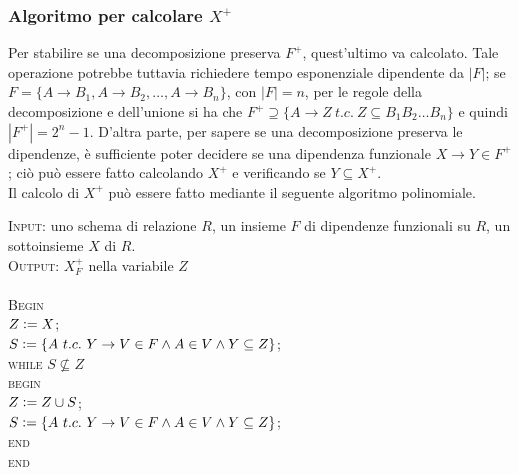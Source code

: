 \subsubsection{Algoritmo per calcolare $X^+$}
Per stabilire se una decomposizione preserva $F^+$, quest'ultimo va calcolato. Tale operazione potrebbe 
tuttavia richiedere tempo esponenziale dipendente da $|F|$; se $F = \{A \rightarrow B_1, A \rightarrow B_2,
\ldots, A \rightarrow B_n\}$, con $|F|=n$, per le regole della decomposizione e dell'unione si ha che 
$F^+ \supseteq \{A \rightarrow Z\ t.c.\ Z \subseteq B_1B_2\ldots B_n\}$ e quindi $|F^+| = 2^n-1$. D'altra parte,
per sapere se una decomposizione preserva le dipendenze, è sufficiente poter decidere se una dipendenza 
funzionale $X \rightarrow Y \in F^+$; ciò può essere fatto calcolando $X^+$ e verificando se $Y \subseteq 
X^+$.\\ 
Il calcolo di $X^+$ può essere fatto mediante il seguente algoritmo polinomiale.
\begin{alg}
\textsc{Input:} uno schema di relazione $R$, un insieme $F$ di dipendenze funzionali su $R$, un sottoinsieme
$X$ di $R$.\\
\textsc{Output:} $X^+_F$ nella variabile $Z$\\\\
\textsc{Begin}\\
$Z\vcentcolon= X$;\\
$S\vcentcolon= \{A\ t.c.\ Y \rightarrow V \in F \wedge A \in V \wedge Y \subseteq Z\}$;\\
\textsc{while} $S \not \subseteq Z$\\
\indent \textsc{begin}\\
\indent $Z\vcentcolon = Z \cup S$;\\
\indent $S\vcentcolon= \{A\ t.c.\ Y \rightarrow V \in F \wedge A \in V \wedge Y \subseteq Z\}$;\\
\indent \textsc{end}\\
\textsc{end}\\
\end{alg}

